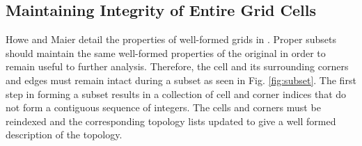 \subsection{Maintaining Integrity of Entire Grid Cells}

Howe and Maier detail the properties of well-formed grids in \cite{UGRID}.
Proper subsets should maintain the same well-formed properties of the original
in order to remain useful to further analysis.  Therefore, the cell and its
surrounding corners and edges must remain intact during a subset as seen in
Fig. \ref{fig:subset}. The first step in forming a subset results in a
collection of cell and corner indices that do not form a contiguous sequence
of integers. The cells and corners must be reindexed and the corresponding topology
lists updated to give a well formed description of the topology.
